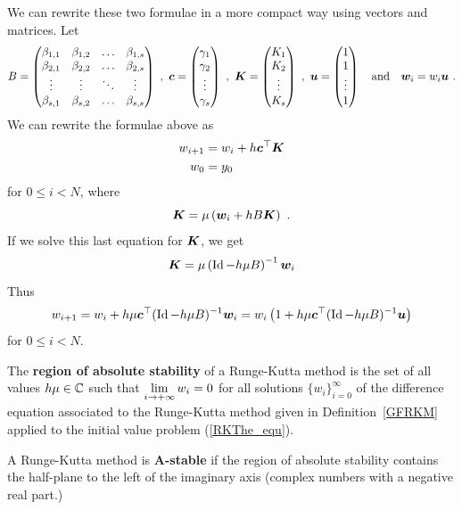 We can rewrite these two formulae in a more compact way using vectors and
matrices.  Let
\[
B = \begin{pmatrix} \beta_{1,1} & \beta_{1,2} & \ldots & \beta_{1,s} \\
\beta_{2,1} & \beta_{2,2} & \ldots & \beta_{2,s} \\
\vdots & \vdots & \ddots & \vdots \\
\beta_{s,1} & \beta_{s,2} & \ldots & \beta_{s,s}
\end{pmatrix}
\ , \
\bm{c} = \begin{pmatrix} \gamma_1 \\ \gamma_2 \\ \vdots \\ \gamma_s
\end{pmatrix}
\ , \
\bm{K} = \begin{pmatrix} K_1 \\ K_2 \\ \vdots \\ K_s \end{pmatrix}
\ , \
\bm{u} = \begin{pmatrix} 1 \\ 1 \\ \vdots \\ 1 \end{pmatrix}
\quad \text{and} \quad
\bm{w}_i = w_i \bm{u} \ .
\]
We can rewrite the formulae above as
\begin{align*}
w_{i+1} &= w_i + h \bm{c}^{\top} \bm{K} \\
w_0 &= y_0
\end{align*}
for $0\leq i < N$, where
\[
\bm{K} = \mu \left( \bm{w}_i + h B \bm{K}\right) \ .
\]
If we solve this last equation for $\bm{K}$, we get
\[
  \bm{K} = \mu\left( \operatorname{Id} - h\mu B\right)^{-1} \bm{w}_i
\]
Thus
\begin{equation}\label{RK_stabA1}
  w_{i+1} = w_i + h\mu \bm{c}^{\top}(\operatorname{Id}-h\mu B)^{-1} \bm{w}_i
= w_i\left(1 + h\mu \bm{c}^{\top}(\operatorname{Id}-h\mu B)^{-1}\bm{u} \right)
\end{equation}
for $0\leq i <N$.

\begin{defn}
The {\bfseries region of absolute stability} of a Runge-Kutta method 
is the set of all values $h\mu \in \mathbb{C}$ such that
$\displaystyle \lim_{i\rightarrow +\infty} w_i = 0$ for all solutions
$\{w_i\}_{i=0}^\infty$ of the difference equation associated to the
Runge-Kutta method given in Definition~\ref{GFRKM} applied to the initial
value problem (\ref{RKThe_equ}).  \label{DefnABSAS}

A Runge-Kutta method is
{\bfseries A-stable}\index{Runge-Kutta!A-Stable} if the region of absolute
stability contains the half-plane to the left of the imaginary axis
(complex numbers with a negative real part.)
\end{defn}

